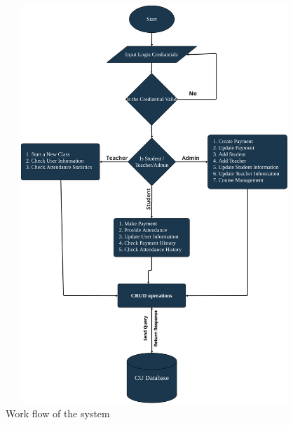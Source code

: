 \begin{figure}[H]
    \centering
    \label{fig:flowchart}
    \includegraphics[height=15cm, width=1\textwidth]{images/flowchart}
    \caption{Work flow of the system}
\end{figure}

\clearpage